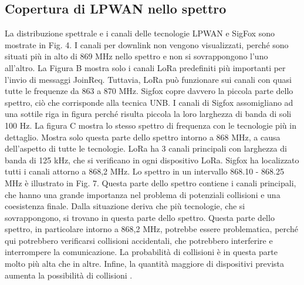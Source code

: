 \documentclass[a4paper]{report} %
\begin{document}
\subsection{Copertura di LPWAN nello spettro}
La distribuzione spettrale e i canali delle tecnologie LPWAN e SigFox sono mostrate in Fig. 4. I canali per downlink non vengono visualizzati, perché sono situati più in alto di 869 MHz nello spettro e non si sovrappongono l'uno all'altro. La Figura B mostra solo i canali LoRa predefiniti più importanti per l'invio di messaggi JoinReq. Tuttavia, LoRa può funzionare sui canali con quasi tutte le frequenze da 863 a 870 MHz. Sigfox copre davvero la piccola parte dello spettro, ciò che corrisponde alla tecnica UNB. I canali di Sigfox assomigliano ad una sottile riga in figura perché risulta piccola la loro larghezza di banda di soli 100 Hz. 
La figura C mostra lo stesso spettro di frequenza con le tecnologie più in dettaglio. Mostra solo questa parte dello spettro intorno a 868 MHz, a causa dell'aspetto di tutte le tecnologie. LoRa ha 3 canali principali con larghezza di banda di 125 kHz, che si verificano in ogni dispositivo LoRa. Sigfox ha localizzato tutti i canali attorno a 868,2 MHz. Lo spettro in un intervallo 868.10 - 868.25 MHz è illustrato in Fig. 7. Questa parte dello spettro contiene i canali principali, che hanno una grande importanza nel problema di potenziali collisioni e una coesistenza finale. Dalla situazione deriva che più tecnologie, che si sovrappongono, si trovano in questa parte dello spettro. Questa parte dello spettro, in particolare intorno a 868,2 MHz, potrebbe essere problematica, perché qui potrebbero verificarsi collisioni accidentali, che potrebbero interferire e interrompere la comunicazione. La probabilità di collisioni è in questa parte molto più alta che in altre. Infine, la quantità maggiore di dispositivi prevista aumenta la possibilità di collisioni \cite{art:rif.46}.
\end{document}
